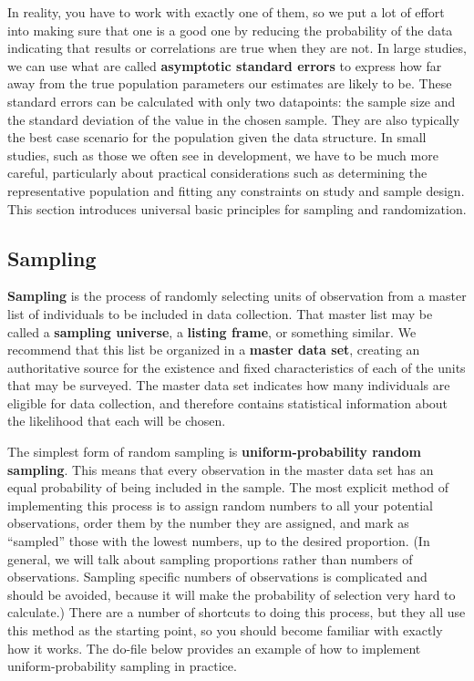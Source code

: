 In reality, you have to work with exactly one of them,
so we put a lot of effort into making sure that one is a good one
by reducing the probability of the data indicating that results or correlations are true when they are not.
In large studies, we can use what are called \textbf{asymptotic standard errors}
to express how far away from the true population parameters our estimates are likely to be.
These standard errors can be calculated with only two datapoints:
the sample size and the standard deviation of the value in the chosen sample.
They are also typically the best case scenario for the population given the data structure.
In small studies, such as those we often see in development,
we have to be much more careful, particularly about practical considerations
such as determining the representative population
and fitting any constraints on study and sample design.
This section introduces universal basic principles for sampling and randomization.

\subsection{Sampling}

\textbf{Sampling} is the process of randomly selecting units of observation
from a master list of individuals to be included in data collection.
That master list may be called a \textbf{sampling universe}, a \textbf{listing frame}, or something similar.
We recommend that this list be organized in a \textbf{master data set},
creating an authoritative source for the existence and fixed
characteristics of each of the units that may be surveyed.
The master data set indicates how many individuals are eligible for data collection,
and therefore contains statistical information about the likelihood that each will be chosen.

The simplest form of random sampling is \textbf{uniform-probability random sampling}.
This means that every observation in the master data set
has an equal probability of being included in the sample.
The most explicit method of implementing this process
is to assign random numbers to all your potential observations,
order them by the number they are assigned,
and mark as ``sampled'' those with the lowest numbers, up to the desired proportion.
(In general, we will talk about sampling proportions rather than numbers of observations.
Sampling specific numbers of observations is complicated and should be avoided,
because it will make the probability of selection very hard to calculate.)
There are a number of shortcuts to doing this process,
but they all use this method as the starting point,
so you should become familiar with exactly how it works.
The do-file below provides an example of how to implement uniform-probability sampling in practice. 

